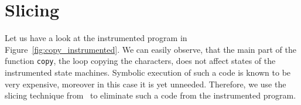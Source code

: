 \documentclass[10pt]{llncs}
\begin{document}

\section{Slicing} \label{sec:slicing}

Let us have a look at the instrumented program in
Figure~\ref{fig:copy_instrumented}. We can easily observe, that the main part
of the function \texttt{copy}, the loop copying the characters, does not
affect states of the instrumented state machines. Symbolic execution of such a
code is known to be very expensive, moreover in this case it is yet unneeded.
Therefore, we use the slicing technique from~\cite{Wei84} to eliminate such a
code from the instrumented program.

\end{document}

